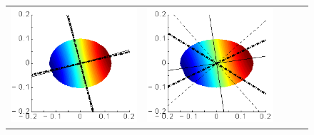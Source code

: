 \documentclass[a4paper,11pt]{article}
\begin{document}
\begin{figure}[h]
\begin{tabular*}{1\textwidth}{c|cc|cc|}
\begin{minipage}{0.22\textwidth}
	\includegraphics[width=1\linewidth]{./images/SAFE/SAFE_BS_10x8_HTI_45/P_s_5_5kHz-pstool.eps}	
\end{minipage}&
\begin{minipage}{0.22\textwidth}
	\includegraphics[width=1\linewidth]{./images/SAFE/SAFE_BS_15x10_HTI_45/P_s_3_3kHz-pstool.eps}	

\end{minipage}
\end{tabular*}
\end{figure}
\end{document}
